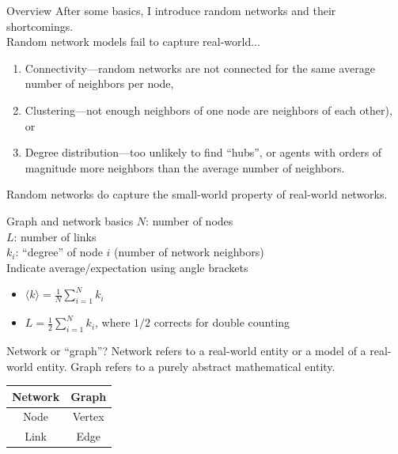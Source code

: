 \documentclass{beamer}
\begin{document}
\begin{frame}{Overview}
  After some basics, I introduce random networks and their shortcomings. \\[.2em]

  Random network models fail to capture real-world...
  \begin{enumerate}
    \item Connectivity---random networks are not connected for the same average
      number of neighbors per node,
    \item Clustering---not enough neighbors of one node are neighbors of each other), or
    \item Degree distribution---too unlikely to find ``hubs'', or agents with orders
      of magnitude more neighbors than the average number of neighbors.
  \end{enumerate} 
  \vspace{.2em}
  
  Random networks do capture the small-world property of real-world networks.
\end{frame}

\begin{frame}{Graph and network basics}
  $N$: number of nodes \\
  $L$: number of links \\
  $k_i$: ``degree'' of node $i$ (number of network neighbors) \\[1em]

  Indicate average/expectation using angle brackets
  \begin{center}
    \begin{itemize}
      \item $\langle k \rangle = \frac{1}{N} \sum_{i=1}^N k_i$
      \item $L = \frac{1}{2} \sum_{i=1}^N k_i$, where $1/2$ corrects for double counting 
    \end{itemize}

  \end{center}
\end{frame}

\begin{frame}{Network or ``graph''?}
  Network refers to a real-world entity or a model of a real-world entity. 
  Graph refers to a purely abstract mathematical entity. \\[2em]

  \centering
  \begin{tabular}{cc}
    \textbf{Network} & \textbf{Graph} \\
    \hline
    Node & Vertex \\
    Link & Edge 
  \end{tabular}
\end{frame}
\end{document}

